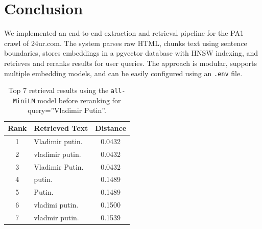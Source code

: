 \documentclass[conference]{IEEEtran}
\begin{document}

\section{Conclusion}
We implemented an end-to-end extraction and retrieval pipeline for the PA1 crawl of 24ur.com. The system parses raw HTML, chunks text using sentence boundaries, stores embeddings in a pgvector database with HNSW indexing, and retrieves and reranks results for user queries. The approach is modular, supports multiple embedding models, and can be easily configured using an \texttt{.env} file.





\onecolumn
\appendix

\begin{table}[h]
\centering
\small
\begin{tabular}{|c|p{13cm}|c|}
    \hline
    \textbf{Rank} & \textbf{Retrieved Text} & \textbf{Distance} \\
\hline
1 & Vladimir putin. & 0.0432 \\
\hline
2 & vladimir putin. & 0.0432 \\
\hline
3 & Vladimir Putin. & 0.0432 \\
\hline
4 & putin. & 0.1489 \\
\hline
5 & Putin. & 0.1489 \\
\hline
6 & vladimi putin. & 0.1500 \\
\hline
7 & vladmir putin. & 0.1539 \\
\hline
\end{tabular}
\caption{Top 7 retrieval results using the \texttt{all-MiniLM} model before reranking for query=''Vladimir Putin''.}
\label{tab:short_query}
\end{table}
\end{document}
